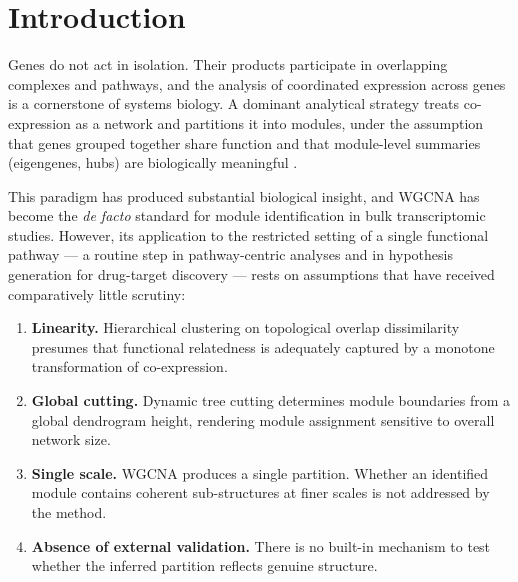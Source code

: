 \documentclass[twocolumn,11pt]{article}
\begin{document}
\begin{abstract}
\vspace{6pt}
\noindent\textbf{Contact:} [email] \quad
\textbf{Supplementary information:} available at [URL]\\
\noindent\textbf{Keywords:} functional module partitioning; community detection; Leiden
algorithm; WGCNA; graph neural networks; self-supervised learning; benchmarking
\end{abstract}

\vspace{2pt}

\section{Introduction}

Genes do not act in isolation. Their products participate in overlapping complexes and
pathways, and the analysis of coordinated expression across genes is a cornerstone of
systems biology. A dominant analytical strategy treats co-expression as a network and
partitions it into modules, under the assumption that genes grouped together share
function and that module-level summaries (eigengenes, hubs) are biologically meaningful
\citep{langfelder2008wgcna}.

This paradigm has produced substantial biological insight, and WGCNA has become the
\emph{de facto} standard for module identification in bulk transcriptomic studies.
However, its application to the restricted setting of a single functional pathway --- a
routine step in pathway-centric analyses and in hypothesis generation for drug-target
discovery --- rests on assumptions that have received comparatively little scrutiny:

\begin{enumerate}
\item \textbf{Linearity.} Hierarchical clustering on topological overlap dissimilarity
presumes that functional relatedness is adequately captured by a monotone transformation
of co-expression.
\item \textbf{Global cutting.} Dynamic tree cutting determines module boundaries from a
global dendrogram height, rendering module assignment sensitive to overall network size.
\item \textbf{Single scale.} WGCNA produces a single partition. Whether an identified
module contains coherent sub-structures at finer scales is not addressed by the method.
\item \textbf{Absence of external validation.} There is no built-in mechanism to test
whether the inferred partition reflects genuine structure.
\end{enumerate}
\end{document}
